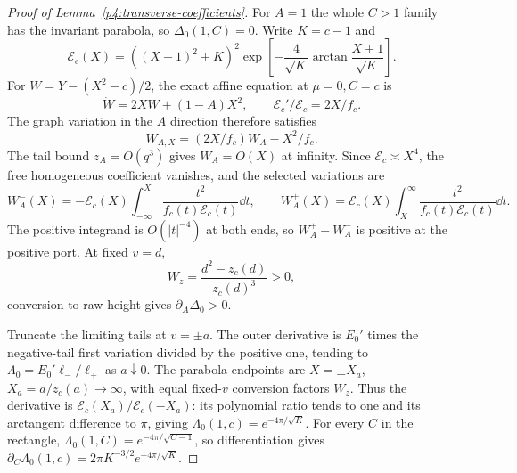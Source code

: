\label{app:lower-coefficients-proof}

\begin{proof}[Proof of Lemma~\ref{p4:transverse-coefficients}]
For $A=1$ the whole $C>1$ family has the invariant parabola, so
$\Delta_0(1,C)=0$.
Write $K=c-1$ and
\[
 \mathcal E_c(X)=((X+1)^2+K)^2
 \exp\left[-\frac4{\sqrt K}
                \arctan\frac{X+1}{\sqrt K}\right].
\]
For $W=Y-(X^2-c)/2$, the exact affine equation at $\mu=0,C=c$ is
\[
 \dot W=2XW+(1-A)X^2,\qquad
 \mathcal E_c'/\mathcal E_c=2X/f_c.
\]
The graph variation in the $A$ direction therefore satisfies
\[
 W_{A,X}=(2X/f_c)W_A-X^2/f_c.
\]
The tail bound $z_A=O(q^3)$ gives $W_A=O(X)$ at infinity.
Since $\mathcal E_c\asymp X^4$, the free homogeneous coefficient
vanishes, and the selected variations are
\[
 W_A^-(X)=-\mathcal E_c(X)\int_{-\infty}^X
       \frac{t^2}{f_c(t)\mathcal E_c(t)}\dd t,\qquad
 W_A^+(X)=\mathcal E_c(X)\int_X^\infty
       \frac{t^2}{f_c(t)\mathcal E_c(t)}\dd t.
\]
The positive integrand is $O(|t|^{-4})$ at both ends, so
$W_A^+-W_A^-$ is positive at the positive port. At fixed $v=d$,
\[
 W_z=\frac{d^2-z_c(d)}{z_c(d)^3}>0,
\]
conversion to raw height gives $\partial_A\Delta_0>0$.

Truncate the limiting tails at $v=\pm a$. The outer derivative is
$E_0'$ times the negative-tail first variation divided by the positive
one, tending to $\Lambda_0=E_0'\ell_-/\ell_+$ as $a\downarrow0$.
The parabola endpoints are $X=\pm X_a$, $X_a=a/z_c(a)\to\infty$,
with equal fixed-$v$ conversion factors $W_z$. Thus the derivative
is $\mathcal E_c(X_a)/\mathcal E_c(-X_a)$: its polynomial ratio tends
to one and its arctangent difference to $\pi$, giving
$\Lambda_0(1,c)=e^{-4\pi/\sqrt K}$. For every $C$ in the rectangle,
$\Lambda_0(1,C)=e^{-4\pi/\sqrt{C-1}}$, so differentiation gives
$\partial_C\Lambda_0(1,c)=2\pi K^{-3/2}e^{-4\pi/\sqrt K}$.
\end{proof}
